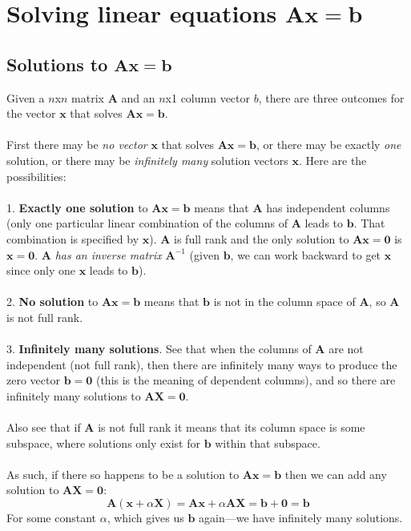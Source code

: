 \documentclass{report}
\begin{document}
\chapter{Solving linear equations $\bm{Ax}=\bm b$}\newpage

\section{Solutions to $\bm{Ax}=\bm b$}
Given a $n$x$n$ matrix $\bm A$ and an $n$x1 column vector $b$, there are three outcomes for the vector $\bm x$ that solves $\bm{Ax}=\bm b$.\\
\vspace{1mm}\\
First there may be \textit{no vector} $\bm x$ that solves $\bm{Ax}=\bm b$, or there may be exactly \textit{one} solution, or there may be \textit{infinitely many}
solution vectors $\bm x$. Here are the possibilities:\\
\vspace{1mm}\\
1. \textbf{Exactly one solution} to $\bm{Ax}=\bm b$ means that $\bm A$ has independent columns (only one particular linear combination of the columns of $\bm A$
leads to $\bm b$. That combination is specified by $\bm x$). $\bm A$ is full rank and the only solution to $\bm{Ax}=\bm{0}$ is $\bm x=\bm0$. 
$\bm A$ \textit{has an inverse matrix} $\bm A^{-1}$ (given $\bm b$, we can work backward to get $\bm x$ since only one $\bm x$ leads to $\bm b$).\\
\vspace{1mm}\\
2. \textbf{No solution} to $\bm{Ax}=\bm b$ means that $\bm b$ is not in the column space of $\bm A$, so $\bm A$ is not full rank.\\
\vspace{1mm}\\
3. \textbf{Infinitely many solutions}. See that when the columns of $\bm A$ are not independent (not full rank), then there are infinitely many ways to
produce the zero vector $\bm b=\bm0$ (this is the meaning of dependent columns), and so there are infinitely many solutions to $\bm{AX}=\bm0$.\\
\vspace{1mm}\\ 
Also see that if $\bm A$ is not full rank it means that its column space is some subspace, where
solutions only exist for $\bm b$ within that subspace.\\
\vspace{1mm}\\
As such, if there so happens to be a solution to $\bm{Ax}=\bm b$ then we can add any solution to $\bm{AX}=\bm0$:
\begin{equation*}
\bm A(\bm x+\alpha\bm X)=\bm A\bm x+\alpha\bm A\bm X=\bm b+\bm0=\bm b
\end{equation*}
For some constant $\alpha$, which gives us $\bm b$ again---we have infinitely many solutions.
\newpage
\end{document}

